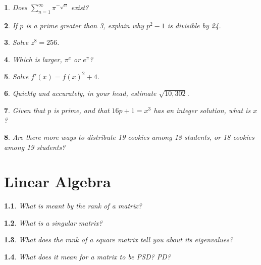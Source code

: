 \documentclass{report}
\newtheorem{problem}{}
\numberwithin{problem}{chapter} %
\newcommand{\ds}{\displaystyle}
\begin{document}
\begin{problem}
Does $\ds \sum_{n=1}^\infty \pi^{-\sqrt{n}}$ exist?
\end{problem}

\begin{problem}
\cite{CRACK}
If $p$ is a prime greater than 3, explain why $p^2-1$ is divisible by 24. 
\end{problem}

\begin{problem}
Solve $z^8=256$.
\end{problem}

\begin{problem}
\cite{STRAWA}
Which is larger, $\pi^e$ or $e^\pi$?
\end{problem}

\begin{problem}
Solve $f'(x)=f(x)^2+4$.
\end{problem}

\begin{problem}
Quickly and accurately, in your head, estimate $\sqrt{10,302}$.
\end{problem}

\begin{problem}
Given that $p$ is prime, and that $16p+1 = x^3$ has an integer solution, what is $x$?
\end{problem}

\begin{problem}
Are there more ways to distribute 19 cookies among 18 students, or 18 cookies among 19 students? 
\end{problem}


\chapter{Linear Algebra}

\begin{problem}
What is meant by the {\it rank} of a matrix? 
\end{problem}

\begin{problem}
What is a  {\it singular} matrix? 
\end{problem}

\begin{problem}
What does the rank of a square matrix tell you about its eigenvalues?
\end{problem}

\begin{problem}
What does it mean for a matrix to be PSD? PD?
\end{problem}
\end{document}

